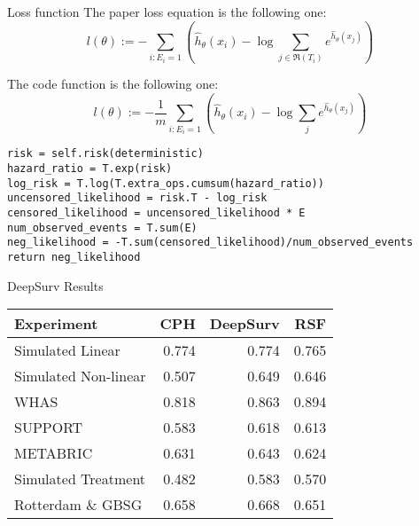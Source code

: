 \begin{frame}[fragile]{Loss function}
The paper loss equation is the following one:
\[
    l(\theta) := -\sum_{i:E_i = 1} \left(
    \hat{h}_{\theta}(x_i) - \log \sum_{j \in \mathfrak{R}(T_i)} e^{\hat{h}_{\theta} (x_j)}
    \right)
\]

The code function is the following one:
\[
    l(\theta) := - \frac{1}{m} \sum_{i:E_i = 1} \left(
    \hat{h}_{\theta}(x_i) - \log \sum_{j} e^{\hat{h}_{\theta} (x_j)}
    \right)
\]

\footnotesize
\begin{verbatim}
risk = self.risk(deterministic)
hazard_ratio = T.exp(risk)
log_risk = T.log(T.extra_ops.cumsum(hazard_ratio))
uncensored_likelihood = risk.T - log_risk
censored_likelihood = uncensored_likelihood * E
num_observed_events = T.sum(E)
neg_likelihood = -T.sum(censored_likelihood)/num_observed_events
return neg_likelihood
\end{verbatim}
\end{frame}

\begin{frame}{DeepSurv Results}

\begin{center}
    \begin{tabular}{l|rrr}
        Experiment & CPH & DeepSurv & RSF \\
        \hline
        Simulated Linear & 0.774 & 0.774 & 0.765 \\
        Simulated Non-linear &  0.507 & 0.649 & 0.646 \\
        WHAS & 0.818 & 0.863 & 0.894 \\
        SUPPORT & 0.583 & 0.618 & 0.613 \\
        METABRIC & 0.631 & 0.643 & 0.624 \\
        Simulated Treatment & 0.482 & 0.583 & 0.570 \\
        Rotterdam \& GBSG & 0.658 & 0.668 & 0.651
    \end{tabular}
\end{center}
    

\end{frame}